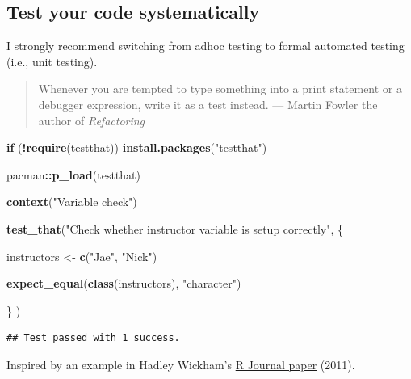 \documentclass[
]{book}
\newenvironment{Shaded}{\begin{snugshade}}{\end{snugshade}}
\newcommand{\ControlFlowTok}[1]{\textcolor[rgb]{0.13,0.29,0.53}{\textbf{#1}}}
\newcommand{\FunctionTok}[1]{\textcolor[rgb]{0.13,0.29,0.53}{\textbf{#1}}}
\newcommand{\NormalTok}[1]{#1}
\newcommand{\OtherTok}[1]{\textcolor[rgb]{0.56,0.35,0.01}{#1}}
\newcommand{\SpecialCharTok}[1]{\textcolor[rgb]{0.81,0.36,0.00}{\textbf{#1}}}
\newcommand{\StringTok}[1]{\textcolor[rgb]{0.31,0.60,0.02}{#1}}
\begin{document}
\subsection{Test your code systematically}\label{test-your-code-systematically}

I strongly recommend switching from adhoc testing to formal automated testing (i.e., unit testing).

\begin{quote}
Whenever you are tempted to type something into a print statement or a debugger expression, write it as a test instead. --- Martin Fowler the author of \emph{Refactoring}
\end{quote}

\begin{Shaded}
\begin{Highlighting}[]
\ControlFlowTok{if}\NormalTok{ (}\SpecialCharTok{!}\FunctionTok{require}\NormalTok{(testthat)) }\FunctionTok{install.packages}\NormalTok{(}\StringTok{"testthat"}\NormalTok{)}

\NormalTok{pacman}\SpecialCharTok{::}\FunctionTok{p\_load}\NormalTok{(testthat)}

\FunctionTok{context}\NormalTok{(}\StringTok{"Variable check"}\NormalTok{)}

\FunctionTok{test\_that}\NormalTok{(}\StringTok{"Check whether instructor variable is setup correctly"}\NormalTok{, \{}

\NormalTok{  instructors }\OtherTok{\textless{}{-}} \FunctionTok{c}\NormalTok{(}\StringTok{"Jae"}\NormalTok{, }\StringTok{"Nick"}\NormalTok{)}

  \FunctionTok{expect\_equal}\NormalTok{(}\FunctionTok{class}\NormalTok{(instructors), }\StringTok{"character"}\NormalTok{)}

\NormalTok{\}}
\NormalTok{)}
\end{Highlighting}
\end{Shaded}

\begin{verbatim}
## Test passed with 1 success.
\end{verbatim}

Inspired by an example in Hadley Wickham's \href{https://journal.r-project.org/archive/2011-1/RJournal_2011-1_Wickham.pdf}{R Journal paper} (2011).
\end{document}
